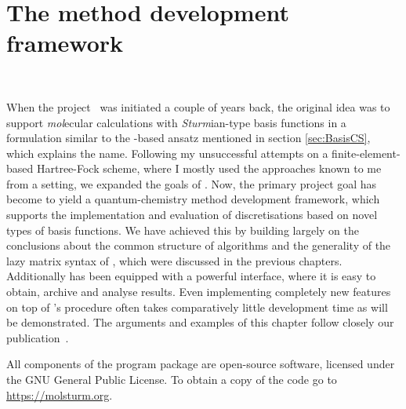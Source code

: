 \chapter{The \molsturm method development framework}
\label{ch:Molsturm}
 \\


\noindent
When the \molsturm project~\cite{molsturmWeb} was initiated a couple of years back,
the original idea was to support \textit{mol}ecular calculations
with \textit{Sturm}ian-type basis functions
in a formulation similar to the \contraction-based ansatz mentioned in section \ref{sec:BasisCS},
which explains the name.
Following my unsuccessful attempts on a finite-element-based Hartree-Fock scheme,
where I mostly used the approaches known to me from a \cGTO setting,
we expanded the goals of \molsturm.
Now, the primary project goal has become to yield a quantum-chemistry
method development framework,
which supports the implementation and evaluation
of discretisations based on novel types of basis functions.
We have achieved this by building largely on the conclusions
about the common structure of \SCF algorithms
and the generality of the lazy matrix syntax of \lazyten,
which were discussed in the previous chapters.
Additionally \molsturm has been equipped with a powerful \python interface,
where it is easy to obtain, archive and analyse results.
Even implementing completely new features on top of \molsturm's \SCF procedure
often takes comparatively little development time as will be demonstrated.
The arguments and examples of this chapter follow
closely our publication~\cite{molsturmDesign}.

All components of the \molsturm program package
are open-source software, licensed under the GNU General Public License.
To obtain a copy of the code go to \url{https://molsturm.org}.





